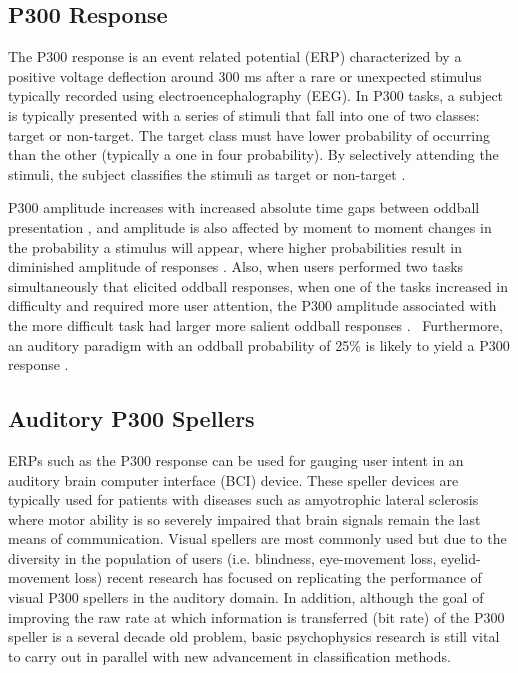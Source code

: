 \documentclass[10pt]{article}
\begin{document}
\subsection{P300 Response} 
The P300 response is an event related
potential (ERP) characterized by a positive voltage deflection
around 300 ms after a rare or unexpected stimulus typically recorded
using electroencephalography (EEG). In P300 tasks, a subject is
typically presented with a series of stimuli that fall into one of
two classes: target or non-target.  The target class must have lower
probability of occurring than the other (typically a one in four
probability).  By selectively attending the stimuli, the subject
classifies the stimuli as target or non-target \cite{Wolpaw2012}.

P300 amplitude increases with increased absolute time gaps
between oddball presentation \cite{GONSALVEZ2002}, and
amplitude is also affected by moment to moment changes in the
probability a stimulus will appear, where higher probabilities
result in diminished amplitude of responses
\cite{Donchin1981}.  Also, when users performed two tasks
simultaneously that elicited oddball responses, when one of
the tasks increased in difficulty and required more user
attention, the P300 amplitude associated with the more
difficult task had larger more salient oddball responses
\cite{Sirevaag1989}.  Furthermore, an auditory paradigm with
an oddball probability of 25\% is likely to yield a P300
response \cite{Nijboer2008}. 

\subsection{Auditory P300 Spellers} 
ERPs such as the P300 response can be used for gauging user intent
in an auditory brain computer interface (BCI) device.
These speller
devices are typically used for patients with diseases such as
amyotrophic lateral sclerosis where motor ability is so severely
impaired that brain signals remain the last means of
communication\cite{Nijboer2008}.  Visual spellers are most commonly
used but due to the diversity in the population of users (i.e.
blindness, eye-movement loss, eyelid-movement loss) recent research
has focused on replicating the performance of visual P300 spellers
in the auditory domain.  In addition, although the goal of improving
the raw rate at which information is transferred (bit rate) of
the P300 speller is a several decade old problem, basic
psychophysics research is still vital to carry out in parallel with
new advancement in classification methods.
\end{document}
